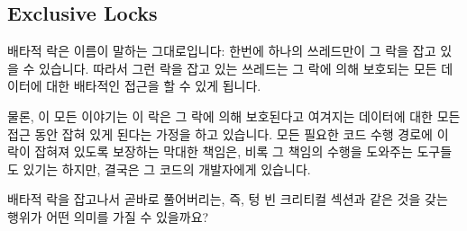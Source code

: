 \subsection{Exclusive Locks}
\label{sec:locking:Exclusive Locks}

배타적 락은 이름이 말하는 그대로입니다: 한번에 하나의 쓰레드만이 그 락을 잡고
있을 수 있습니다.
따라서 그런 락을 잡고 있는 쓰레드는 그 락에 의해 보호되는 모든 데이터에 대한
배타적인 접근을 할 수 있게 됩니다.

물론, 이 모든 이야기는 이 락은 그 락에 의해 보호된다고 여겨지는 데이터에 대한
모든 접근 동안 잡혀 있게 된다는 가정을 하고 있습니다.
모든 필요한 코드 수행 경로에 이 락이 잡혀져 있도록 보장하는 막대한 책임은, 비록
그 책임의 수행을 도와주는 도구들도 있기는 하지만, 결국은 그 코드의 개발자에게
있습니다.

\QuickQuiz{}
	배타적 락을 잡고나서 곧바로 풀어버리는, 즉, 텅 빈 크리티컬 섹션과 같은
	것을 갖는 행위가 어떤 의미를 가질 수 있을까요?
	\iffalse

